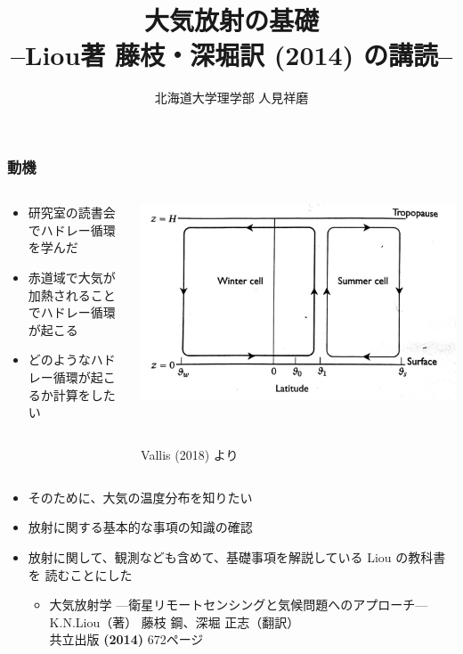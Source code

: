 \documentclass[unicode,colorlinks]{beamer}
\title{大気放射の基礎\\--Liou著 藤枝・深堀訳 (2014) の講読--}
\author{北海道大学理学部 人見祥磨}
\date{\warekitoday}
\newcommand{\centeralign}[1]{\rule{0pt}{0pt}\hfill#1\hfill\rule{0pt}{0pt}}
\begin{document}
\maketitle
\mleftright

\begin{frame}
	\frametitle{動機}
	\small
	\begin{columns}
		\begin{column}{0.45\textwidth}
			\begin{itemize}
				\item 研究室の読書会でハドレー循環を学んだ
				\item 赤道域で大気が加熱されることでハドレー循環が起こる
				\item どのようなハドレー循環が起こるか計算をしたい
			\end{itemize}
		\end{column}
		\begin{column}{0.45\textwidth}
			\centeralign{\includegraphics[width=\textwidth]{hadley.jpg}}\\
			\centeralign{\tiny Vallis (2018) より}
		\end{column}
	\end{columns}
	\begin{itemize}
		\item そのために、大気の温度分布を知りたい
		\item 放射に関する基本的な事項の知識の確認
		\item 放射に関して、観測なども含めて、基礎事項を解説している Liou の教科書を
			読むことにした
			\begin{itemize}
				\item 大気放射学 {\scriptsize---衛星リモートセンシングと気候問題へのアプローチ---}\\
					K.N.Liou（著） 藤枝 鋼、深堀 正志（翻訳）\\
					共立出版 \textbf{(2014)} 672ページ
			\end{itemize}
	\end{itemize}
\end{frame}
\end{document}
